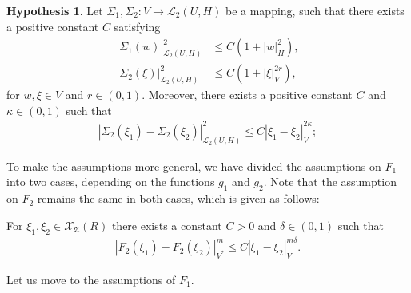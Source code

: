 \documentclass[english,a4paper,11pt]{amsart}
\theoremstyle{plain}
\theoremstyle{definition}
\newtheorem{hypo}[theorem]{Hypothesis}
\theoremstyle{remark}
\numberwithin{equation}{section}
\newcommand{\MA}{\mathfrak{A}}
\begin{document}
\begin{hypo}
\item[(H.2)] Let $\Sigma_1,\Sigma_2:V \to \mathcal{L}_2(U, H)$ be a mapping, such that there exists a positive constant $C$ satisfying
\begin{align*}
	|\Sigma_1(w)|_{\mathcal{L}_2(U,H)}^2& \leq C(1+|w|_H^2),\\
		|\Sigma_2(\xi)|_{\mathcal{L}_2(U,H)}^2& \leq C(1+|\xi|_V^{2r}),
\end{align*}for $w,\xi\in V$ and $r\in(0,1)$. Moreover, there exists a positive constant $C$ and $\kappa\in (0,1)$ such that 
\begin{align*}
	|\Sigma_2(\xi_1)-\Sigma_2(\xi_2)|_{\mathcal{L}_2(U,H)}^2\leq C |\xi_1-\xi_2|_V^{2\kappa};
\end{align*}
%
\item[(H.3)] 
  To make the assumptions more general, we have divided the assumptions on $F_1$ into two cases, depending on the functions $g_1$ and $g_2$.  
Note that the assumption on $F_2$ remains the same in both cases, which is given as follows:

	For $\xi_1,\xi_2\in  \mathcal{X}_\MA(R) $ there exists a constant $C>0$ and $\delta\in (0,1)$ such that
\begin{align}\label{F_2}
	| F_2(\xi_1)-F_2(\xi_2)|_{V^\ast}^m
\le C  | \xi_1-\xi_2|_{V}^{m\delta}.\end{align}




Let us move to the assumptions of $F_1$.
\begin{enumerate}
	

\end{enumerate}
\end{hypo}
\end{document}

